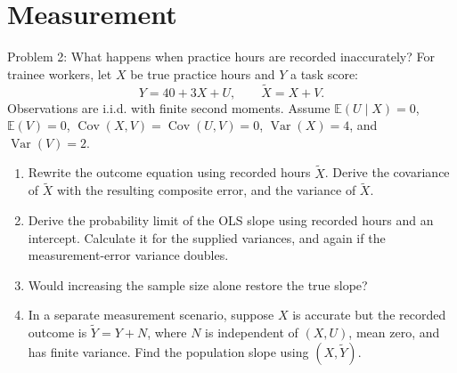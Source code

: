 \documentclass[notes,10pt, aspectratio=169]{beamer}
\newcommand{\E}{\mathbb{E}}
\newcommand{\Var}{\operatorname{Var}}
\newcommand{\Cov}{\operatorname{Cov}}
\begin{document}
\section{Measurement}
\begin{frame}{Problem 2: What happens when practice hours are recorded inaccurately?}
\small
For trainee workers, let $X$ be true practice hours and $Y$ a task score:
\[
Y=40+3X+U,\qquad \widetilde X=X+V.
\]
Observations are i.i.d. with finite second moments. Assume $\E(U\mid X)=0$, $\E(V)=0$, $\Cov(X,V)=\Cov(U,V)=0$, $\Var(X)=4$, and $\Var(V)=2$.
\begin{enumerate}
\setlength{\itemsep}{8pt}
\item Rewrite the outcome equation using recorded hours $\widetilde X$. Derive the covariance of $\widetilde X$ with the resulting composite error, and the variance of $\widetilde X$.
\item Derive the probability limit of the OLS slope using recorded hours and an intercept. Calculate it for the supplied variances, and again if the measurement-error variance doubles.
\item Would increasing the sample size alone restore the true slope?
\item In a separate measurement scenario, suppose $X$ is accurate but the recorded outcome is $\widetilde Y=Y+N$, where $N$ is independent of $(X,U)$, mean zero, and has finite variance. Find the population slope using $(X,\widetilde Y)$.
\end{enumerate}
\end{frame}
\end{document}
